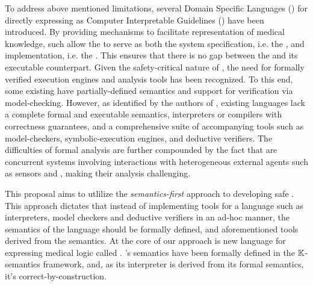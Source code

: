 To address above mentioned limitations, several Domain Specific Languages
(\DSLs{}) for directly expressing \BPGLogic{} as Computer Interpretable
Guidelines (\CIGs{}) have been introduced. By providing mechanisms to facilitate
representation of medical knowledge, such \DSLs{} allow the \CIG{} to serve
as both the system specification, i.e. the \BPG{}, and implementation, i.e. the
\BPGLogic{}. This ensures that there is no gap between the \BPG{} and
its executable counterpart.
Given the safety-critical nature of \CDSSs{}, the need for formally verified
execution engines and analysis tools has been recognized.
To this end, some existing \DSLs{} have partially-defined semantics and
support for verification via model-checking.
However, as identified by the authors of \cite{SuttonAMIA03, ShaharAMIA96},
existing languages lack a complete formal and executable semantics,
interpreters or compilers with correctness guarantees,
and a comprehensive suite of accompanying tools such as model-checkers, symbolic-execution
engines, and deductive verifiers. The difficulties of formal analysis are further compounded
by the fact that \CDSSs{} are concurrent systems involving interactions with
heterogeneous external agents such as sensors and
\HCPs{}, making their analysis challenging.

This proposal aims to utlilize the \emph{semantics-first} approach to developing safe
\CDSSs{}. This approach dictates that instead of
implementing tools for a language such as interpreters, model checkers and
deductive verifiers in an ad-hoc manner, the semantics of the language should
be formally defined, and aforementioned tools derived from the semantics.
At the core of our approach is new language for expressing medical
logic called \MediK{}. \MediK{}'s semantics have been formally defined in
the $\mathbb{K}$-semantics framework, and, as its interpreter is derived from
its formal semantics, it's correct-by-construction.




